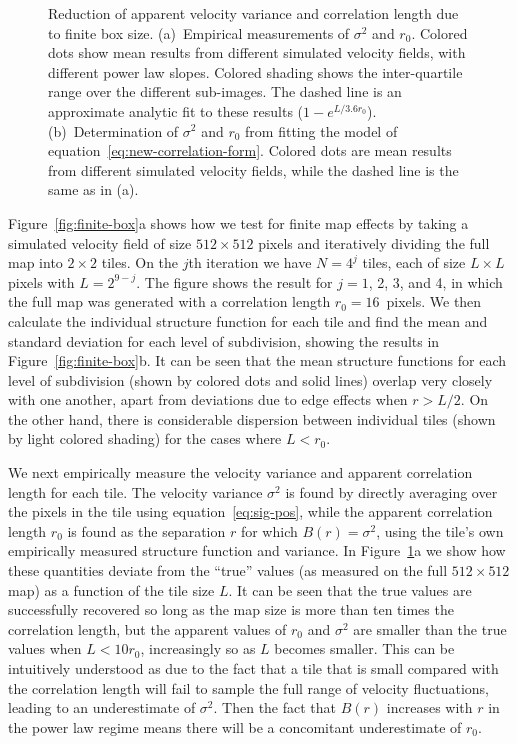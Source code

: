 \documentclass[fleqn,usenatbib, useAMS, a4paper]{mnras}
\begin{document}
\begin{figure}
\begin{tabular}{@{} l @{}}
  \end{tabular}
  \caption{
    Reduction of apparent velocity variance and correlation length
    due to finite box size.
    (a)~Empirical measurements of \(\sigma^2\) and \(r_0\).
    Colored dots show mean results from different simulated velocity fields,
    with different power law slopes.
    Colored shading shows the inter-quartile range over the different sub-images.
    The dashed line is an approximate analytic fit to these results
    (\(1 - e^{L / 3.6r_0}\)).
    (b)~Determination of \(\sigma^2\) and \(r_0\) from fitting the model
    of equation~\eqref{eq:new-correlation-form}.
    Colored dots are mean results from different simulated velocity fields,
    while the dashed line is the same as in (a).
  }
  \label{fig:finite-box-effect}
\end{figure}

Figure~\ref{fig:finite-box}a shows how we test for finite map effects by taking
a simulated velocity field of size \(512 \times 512\) pixels and iteratively
dividing the full map into \(2 \times 2\) tiles.
On the \(j\)th iteration we have \(N = 4^j\) tiles,
each of size \(L \times L \) pixels with \(L = 2^{9 - j}\).
The figure shows the result for \(j = 1\), 2, 3, and 4, in which the full map
was generated with a correlation length \(r_0 = 16\)~pixels.
We then calculate the individual structure function for each tile and
find the mean and standard deviation for each level of subdivision,
showing the results in Figure~\ref{fig:finite-box}b.
It can be seen that the mean structure functions for each level
of subdivision (shown by colored dots and solid lines)
overlap very closely with one another, apart from deviations
due to edge effects when \(r > L/2\).
On the other hand, there is considerable dispersion between
individual tiles (shown by light colored shading) for the cases
where \(L < r_0\).

We next empirically measure the velocity variance and
apparent correlation length for each tile.
The velocity variance \(\sigma^2\) is found by
directly averaging over the pixels in the tile using equation~\eqref{eq:sig-pos},
while the apparent correlation length \(r_0\)
is found as the separation \(r\) for which \(B(r) = \sigma^2\),
using the tile's own empirically measured structure function and variance.
In Figure~\ref{fig:finite-box-effect}a we show how these
quantities deviate from the ``true'' values
(as measured on the full \(512 \times 512\) map)
as a function of the tile size \(L\).
It can be seen that the true values are successfully recovered
so long as the map size is more than ten times the correlation length,
but the apparent values of \(r_0\) and \(\sigma^2\) are smaller than the true values
when \(L < 10 r_0\), increasingly so as \(L\) becomes smaller.
This can be intuitively understood as due to the fact that a tile that
is small compared with the correlation length will
fail to sample the full range of velocity fluctuations,
leading to an underestimate of \(\sigma^2\).
Then the fact that \(B(r)\) increases with \(r\) in the power law regime
means there will be a concomitant underestimate of \(r_0\).
\end{document}
